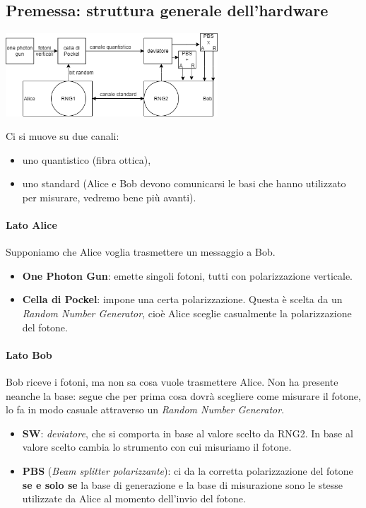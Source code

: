 \subsection{Premessa: struttura generale dell'hardware}
\begin{center}
    \includegraphics[width=300px]{images/QDK_2.png}
\end{center}
Ci si muove su due canali:
\begin{itemize}
	\item uno quantistico (fibra ottica), 
	\item uno standard (Alice e Bob devono comunicarsi le basi che hanno utilizzato per misurare, vedremo bene più avanti).
\end{itemize}
\paragraph{Lato Alice}  Supponiamo che Alice voglia trasmettere un messaggio a Bob.
\begin{itemize}
    \item \textbf{One Photon Gun}: emette singoli fotoni, tutti con polarizzazione verticale.
    \item \textbf{Cella di Pockel}: impone una certa polarizzazione. Questa è scelta da un \emph{Random Number Generator}, cioè Alice sceglie casualmente la polarizzazione del fotone.
\end{itemize}
\paragraph{Lato Bob} Bob riceve i fotoni, ma non sa cosa vuole trasmettere Alice. Non ha presente neanche la base: segue che per prima cosa dovrà scegliere come misurare il fotone, lo fa in modo casuale attraverso un \emph{Random Number Generator}.
\begin{itemize}
	\item \textbf{SW}: \textit{deviatore}, che si comporta in base al valore scelto da RNG2. In base al valore scelto cambia lo strumento con cui misuriamo il fotone.
    \item \textbf{PBS} (\emph{Beam splitter polarizzante}): ci da la corretta polarizzazione del fotone \textbf{se e solo se} la base di generazione e la base di misurazione sono le stesse utilizzate da Alice al momento dell'invio del fotone.
\end{itemize}
